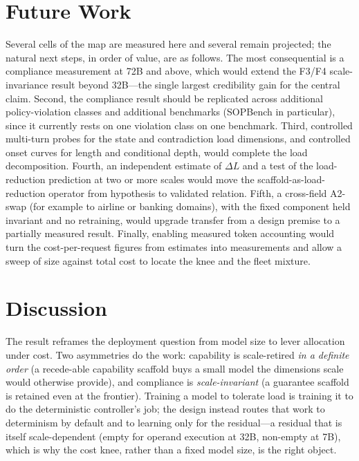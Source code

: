 \documentclass[10pt]{article}
\begin{document}
\section{Future Work}\label{sec:future}
Several cells of the map are measured here and several remain projected; the natural next steps, in order of value, are as follows. The most consequential is a compliance measurement at 72B and above, which would extend the F3/F4 scale-invariance result beyond 32B---the single largest credibility gain for the central claim. Second, the compliance result should be replicated across additional policy-violation classes and additional benchmarks (SOPBench in particular), since it currently rests on one violation class on one benchmark. Third, controlled multi-turn probes for the state and contradiction load dimensions, and controlled onset curves for length and conditional depth, would complete the load decomposition. Fourth, an independent estimate of $\Delta L$ and a test of the load-reduction prediction at two or more scales would move the scaffold-as-load-reduction operator from hypothesis to validated relation. Fifth, a cross-field A2-swap (for example to airline or banking domains), with the fixed component held invariant and no retraining, would upgrade transfer from a design premise to a partially measured result. Finally, enabling measured token accounting would turn the cost-per-request figures from estimates into measurements and allow a sweep of size against total cost to locate the knee and the fleet mixture.

\section{Discussion}
The result reframes the deployment question from model size to lever allocation under cost. Two asymmetries do the work: capability is scale-retired \emph{in a definite order} (a recede-able capability scaffold buys a small model the dimensions scale would otherwise provide), and compliance is \emph{scale-invariant} (a guarantee scaffold is retained even at the frontier). Training a model to tolerate load is training it to do the deterministic controller's job; the design instead routes that work to determinism by default and to learning only for the residual---a residual that is itself scale-dependent (empty for operand execution at 32B, non-empty at 7B), which is why the cost knee, rather than a fixed model size, is the right object.
\end{document}
